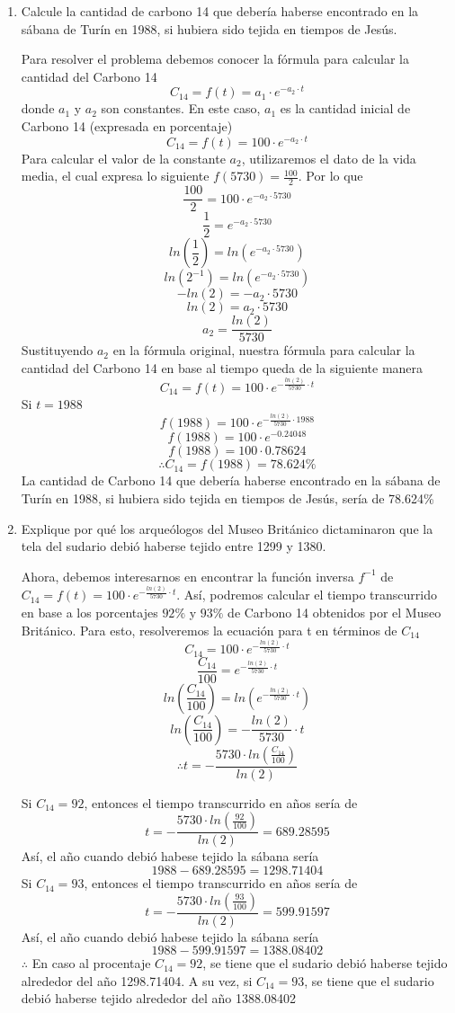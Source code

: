 \documentclass[12pt]{article}
\begin{document}
\begin{enumerate}	
\item Calcule la cantidad de carbono 14 que debería haberse encontrado en la sábana de Turín en 1988, si hubiera sido tejida en tiempos de Jesús.

Para resolver el problema debemos conocer la fórmula para calcular la cantidad del Carbono 14
\[
C_{14}=f(t)=a_1 \cdot e^{-a_2 \cdot t}
\]
donde $a_1$ y $a_2$ son constantes. En este caso, $a_1$ es la cantidad inicial de Carbono 14 (expresada en porcentaje)
\[
C_{14}=f(t)=100 \cdot e^{-a_2 \cdot t}
\]
Para calcular el valor de la constante $a_2$, utilizaremos el dato de la vida media, el cual expresa lo siguiente $f(5730)=\frac{100}{2}$. Por lo que
\[
\frac{100}{2}=100 \cdot e^{-a_2 \cdot 5730}
\]
\[
\frac{1}{2}=e^{-a_2 \cdot 5730}
\]
\[
ln(\frac{1}{2}) = ln ( e^{-a_2 \cdot 5730} )
\]
\[
ln(2^{-1}) = ln ( e^{-a_2 \cdot 5730} )
\]
\[
-ln(2) = -a_2 \cdot 5730
\]
\[
ln(2) = a_2 \cdot 5730
\]
\[
a_2 = \frac{ln(2)}{5730}
\]
Sustituyendo $a_2$ en la fórmula original, nuestra fórmula para calcular la cantidad del Carbono 14 en base al tiempo queda de la siguiente manera
\[
C_{14}=f(t)=100 \cdot e^{-\frac{ln(2)}{5730} \cdot t}
\]
Si $t=1988$
\[
f(1988)=100 \cdot e^{-\frac{ln(2)}{5730} \cdot 1988}
\]
\[
f(1988)=100 \cdot e^{-0.24048}
\]
\[
f(1988)=100 \cdot 0.78624
\]
\[
\therefore C_{14}=f(1988)=78.624\%
\]
La cantidad de Carbono 14 que debería haberse encontrado en la sábana de Turín en 1988, si hubiera sido tejida en tiempos de Jesús, sería de 78.624\%

\item Explique por qué los arqueólogos del Museo Británico dictaminaron que la tela del sudario debió haberse tejido entre 1299 y 1380.

Ahora, debemos interesarnos en encontrar la función inversa $f^{-1}$ de $C_{14}=f(t)=100 \cdot e^{-\frac{ln(2)}{5730} \cdot t}$. Así, podremos calcular el tiempo transcurrido en base a los porcentajes $92\%$ y $93\%$ de Carbono 14 obtenidos por el Museo Británico.
Para esto, resolveremos la ecuación para t en términos de $C_{14}$
\[
C_{14}=100 \cdot e^{-\frac{ln(2)}{5730} \cdot t}
\]
\[
\frac{C_{14}}{100}=e^{-\frac{ln(2)}{5730} \cdot t}
\]
\[
ln(\frac{C_{14}}{100})=ln(e^{-\frac{ln(2)}{5730} \cdot t})
\]
\[
ln(\frac{C_{14}}{100})=-\frac{ln(2)}{5730} \cdot t
\]
\[
\therefore t =-\frac{5730 \cdot ln(\frac{C_{14}}{100})}{ln(2)}
\]

Si $C_{14}=92$, entonces el tiempo transcurrido en años sería de
\[
t =-\frac{5730 \cdot ln(\frac{92}{100})}{ln(2)}=689.28595
\]
Así, el año cuando debió habese tejido la sábana sería
\[
1988-689.28595=1298.71404
\]
Si $C_{14}=93$, entonces el tiempo transcurrido en años sería de
\[
t =-\frac{5730 \cdot ln(\frac{93}{100})}{ln(2)}=599.91597
\]
Así, el año cuando debió habese tejido la sábana sería
\[
1988-599.91597=1388.08402
\]
$\therefore$ En caso al procentaje $C_{14}=92$, se tiene que el sudario debió haberse tejido alrededor del año 1298.71404. A su vez, si $C_{14}=93$, se tiene que el sudario debió haberse tejido alrededor del año 1388.08402


\end{enumerate}
\end{document}
